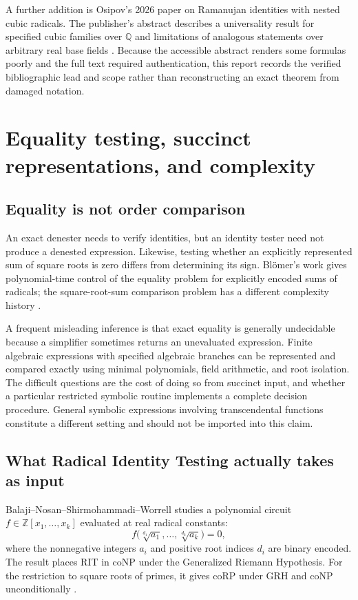 \documentclass[11pt,a4paper]{article}
\numberwithin{equation}{section}
\theoremstyle{definition}\newtheorem{definition}[theorem]{Definition}
\theoremstyle{remark}\newtheorem{remark}[theorem]{Remark}
\newcommand{\Q}{\mathbb Q}\newcommand{\R}{\mathbb R}\newcommand{\C}{\mathbb C}\newcommand{\Z}{\mathbb Z}
\begin{document}
A further addition is Osipov's 2026 paper on Ramanujan identities with nested cubic radicals. The publisher's abstract describes a universality result for specified cubic families over $\Q$ and limitations of analogous statements over arbitrary real base fields \cite{osipov26}. Because the accessible abstract renders some formulas poorly and the full text required authentication, this report records the verified bibliographic lead and scope rather than reconstructing an exact theorem from damaged notation.

\section{Equality testing, succinct representations, and complexity}
\label{sec:complexity}

\subsection{Equality is not order comparison}
An exact denester needs to verify identities, but an identity tester need not produce a denested expression. Likewise, testing whether an explicitly represented sum of square roots is zero differs from determining its sign. Bl\"omer's work gives polynomial-time control of the equality problem for explicitly encoded sums of radicals; the square-root-sum comparison problem has a different complexity history \cite{bloemer91,allender}.

A frequent misleading inference is that exact equality is generally undecidable because a simplifier sometimes returns an unevaluated expression. Finite algebraic expressions with specified algebraic branches can be represented and compared exactly using minimal polynomials, field arithmetic, and root isolation. The difficult questions are the cost of doing so from succinct input, and whether a particular restricted symbolic routine implements a complete decision procedure. General symbolic expressions involving transcendental functions constitute a different setting and should not be imported into this claim.

\subsection{What Radical Identity Testing actually takes as input}
Balaji--Nosan--Shirmohammadi--Worrell studies a polynomial circuit $f\in\Z[x_1,\ldots,x_k]$ evaluated at real radical constants:
\[
f\bigl(\sqrt[d_1]{a_1},\ldots,\sqrt[d_k]{a_k}\bigr)=0,
\]
where the nonnegative integers $a_i$ and positive root indices $d_i$ are binary encoded. The result places RIT in coNP under the Generalized Riemann Hypothesis. For the restriction to square roots of primes, it gives coRP under GRH and coNP unconditionally \cite{rit}.
\end{document}
